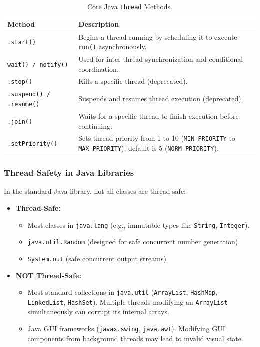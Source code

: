 \documentclass[11pt,a4paper]{article}
\begin{document}
\begin{table}[H]
    \centering
    \begin{tabular}{lp{10.2cm}}
        \toprule
        \textbf{Method} & \textbf{Description} \\
        \midrule
        \texttt{.start()} & Begins a thread running by scheduling it to execute \texttt{run()} asynchronously. \\
        \addlinespace
        \texttt{wait() / notify()} & Used for inter-thread synchronization and conditional coordination. \\
        \addlinespace
        \texttt{.stop()} & Kills a specific thread (deprecated). \\
        \addlinespace
        \texttt{.suspend() / .resume()} & Suspends and resumes thread execution (deprecated). \\
        \addlinespace
        \texttt{.join()} & Waits for a specific thread to finish execution before continuing. \\
        \addlinespace
        \texttt{.setPriority()} & Sets thread priority from 1 to 10 (\texttt{MIN\_PRIORITY} to \texttt{MAX\_PRIORITY}); default is 5 (\texttt{NORM\_PRIORITY}). \\
        \bottomrule
    \end{tabular}
    \caption{Core Java \texttt{Thread} Methods.}
    \label{tab:java_thread_methods}
\end{table}

\subsubsection{Thread Safety in Java Libraries}

\noindent In the standard Java library, not all classes are thread-safe:

\begin{itemize}
    \item \textbf{Thread-Safe:}
    \begin{itemize}
        \item Most classes in \texttt{java.lang} (e.g., immutable types like \texttt{String}, \texttt{Integer}).
        \item \texttt{java.util.Random} (designed for safe concurrent number generation).
        \item \texttt{System.out} (safe concurrent output streams).
    \end{itemize}
    \item \textbf{NOT Thread-Safe:}
    \begin{itemize}
        \item Most standard collections in \texttt{java.util} (\texttt{ArrayList}, \texttt{HashMap}, \texttt{LinkedList}, \texttt{HashSet}). Multiple threads modifying an \texttt{ArrayList} simultaneously can corrupt its internal arrays.
        \item Java GUI frameworks (\texttt{javax.swing}, \texttt{java.awt}). Modifying GUI components from background threads may lead to invalid visual state.
    \end{itemize}
\end{itemize}
\end{document}

